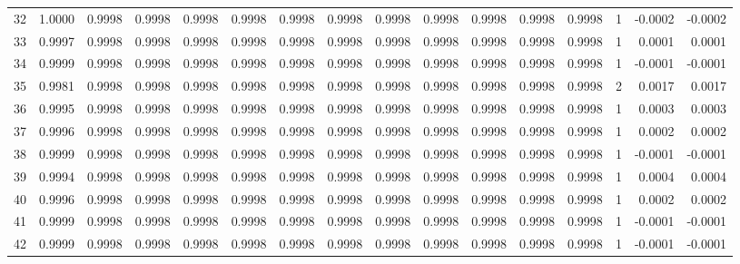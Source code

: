\begin{tabular}{lrrrrrrrrrrrrrrr}
32  &      1.0000 &  0.9998 &  0.9998 &  0.9998 &  0.9998 &  0.9998 &  0.9998 &  0.9998 &  0.9998 &  0.9998 &   0.9998 &     0.9998 &      1 &                   -0.0002 &                    -0.0002 \\
33  &      0.9997 &  0.9998 &  0.9998 &  0.9998 &  0.9998 &  0.9998 &  0.9998 &  0.9998 &  0.9998 &  0.9998 &   0.9998 &     0.9998 &      1 &                    0.0001 &                     0.0001 \\
34  &      0.9999 &  0.9998 &  0.9998 &  0.9998 &  0.9998 &  0.9998 &  0.9998 &  0.9998 &  0.9998 &  0.9998 &   0.9998 &     0.9998 &      1 &                   -0.0001 &                    -0.0001 \\
35  &      0.9981 &  0.9998 &  0.9998 &  0.9998 &  0.9998 &  0.9998 &  0.9998 &  0.9998 &  0.9998 &  0.9998 &   0.9998 &     0.9998 &      2 &                    0.0017 &                     0.0017 \\
36  &      0.9995 &  0.9998 &  0.9998 &  0.9998 &  0.9998 &  0.9998 &  0.9998 &  0.9998 &  0.9998 &  0.9998 &   0.9998 &     0.9998 &      1 &                    0.0003 &                     0.0003 \\
37  &      0.9996 &  0.9998 &  0.9998 &  0.9998 &  0.9998 &  0.9998 &  0.9998 &  0.9998 &  0.9998 &  0.9998 &   0.9998 &     0.9998 &      1 &                    0.0002 &                     0.0002 \\
38  &      0.9999 &  0.9998 &  0.9998 &  0.9998 &  0.9998 &  0.9998 &  0.9998 &  0.9998 &  0.9998 &  0.9998 &   0.9998 &     0.9998 &      1 &                   -0.0001 &                    -0.0001 \\
39  &      0.9994 &  0.9998 &  0.9998 &  0.9998 &  0.9998 &  0.9998 &  0.9998 &  0.9998 &  0.9998 &  0.9998 &   0.9998 &     0.9998 &      1 &                    0.0004 &                     0.0004 \\
40  &      0.9996 &  0.9998 &  0.9998 &  0.9998 &  0.9998 &  0.9998 &  0.9998 &  0.9998 &  0.9998 &  0.9998 &   0.9998 &     0.9998 &      1 &                    0.0002 &                     0.0002 \\
41  &      0.9999 &  0.9998 &  0.9998 &  0.9998 &  0.9998 &  0.9998 &  0.9998 &  0.9998 &  0.9998 &  0.9998 &   0.9998 &     0.9998 &      1 &                   -0.0001 &                    -0.0001 \\
42  &      0.9999 &  0.9998 &  0.9998 &  0.9998 &  0.9998 &  0.9998 &  0.9998 &  0.9998 &  0.9998 &  0.9998 &   0.9998 &     0.9998 &      1 &                   -0.0001 &                    -0.0001 \\

\end{tabular}
